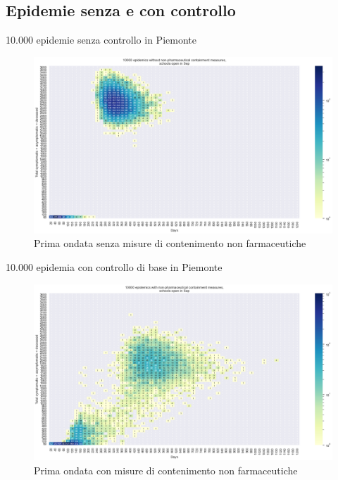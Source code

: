 \documentclass[]{beamer}
\begin{document}
\subsection{Epidemie senza e con controllo}

\begin{frame}{10.000 epidemie senza controllo in Piemonte}



\begin{figure}[H]
\center
\includegraphics[scale=0.28]{10kNoControl.png}
\caption{Prima ondata senza misure di contenimento non farmaceutiche}
\label{noC}
\end{figure}

\end{frame}


\begin{frame}{10.000 epidemia con controllo di base in Piemonte}


\begin{figure}[H]
\center
\includegraphics[scale=0.28]{10kBasicC.png}
\caption{Prima ondata con misure di contenimento non farmaceutiche}
\label{basicC}
\end{figure}

\end{frame}
\end{document}
